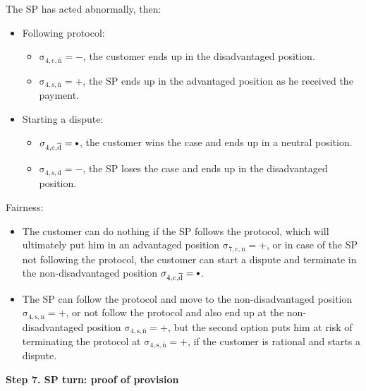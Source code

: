 \documentclass{ieeeaccess}
\newcommand\neutral[1][.75]{\mathbin{\ThisStyle{\vcenter{\hbox{%
  \scalebox{#1}{$\SavedStyle\bullet$}}}}}%
}
\begin{document}
The SP has acted abnormally, then:

\begin{itemize}
\item
  Following protocol:

  \begin{itemize}
  
  \item
    \(\operatorname{\sigma_{4, c, \overline{n}} = -}\), the customer ends up in the disadvantaged position. 
  \item
    \(\operatorname{\sigma_{4, s, \overline{n}} = +}\), the SP ends up in the advantaged position as he received the payment. 
  \end{itemize}
\item
  Starting a dispute:

  \begin{itemize}
  
  \item
    \(\operatorname{\sigma_{4, c, \overline{d}} = \neutral}\), the customer wins the case and ends up in a neutral position. 
  \item
    \(\operatorname{\sigma_{4, s, \overline{d}} = -}\), the SP loses the case and ends up in the disadvantaged position. 
  \end{itemize}
\end{itemize}

Fairness:

\begin{itemize}

\item
  The customer can do nothing if the SP follows the protocol, which will ultimately put him in an advantaged position \(\operatorname{\sigma_{7, c, n} = +}\), or in case of the SP not following the protocol, the customer can start a dispute and terminate in the non-disadvantaged position \(\operatorname{\sigma_{4, c, \overline{d}} = \neutral}\).
\item
  The SP can follow the protocol and move to the non-disadvantaged position \(\operatorname{\sigma_{4, s, n} = +}\), or not follow the protocol and also end up at the non-disadvantaged position \(\operatorname{\sigma_{4, s, \overline{n}} = +}\), but the second option puts him at risk of terminating the protocol at \(\operatorname{\sigma_{4, s, \overline{n}} = +}\), if the customer is rational and starts a dispute.
\end{itemize}

\noindent \textbf
{Step 7. SP turn: proof of provision}\label{step-7-publication-of-proof-of-provision}
\end{document}
